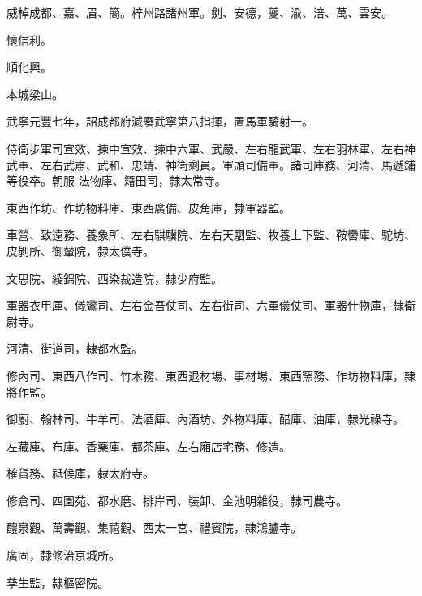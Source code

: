 \begin{pinyinscope}
 威棹成都、嘉、眉、簡。梓州路諸州軍。劍、安德，夔、渝、涪、萬、雲安。



 懷信利。



 順化興。



 本城梁山。



 武寧元豐七年，詔成都府減廢武寧第八指揮，置馬軍騎射一。



 侍衛步軍司宣效、揀中宣效、揀中六軍、武嚴、左右龍武軍、左右羽林軍、左右神武軍、左右武肅、武和、忠靖、神衛剩員。軍頭司備軍。諸司庫務、河清、馬遞鋪等役卒。朝服
 法物庫、籍田司，隸太常寺。



 東西作坊、作坊物料庫、東西廣備、皮角庫，隸軍器監。



 車營、致遠務、養象所、左右騏驥院、左右天駟監、牧養上下監、鞍轡庫、駝坊、皮剝所、御輦院，隸太僕寺。



 文思院、綾錦院、西染裁造院，隸少府監。



 軍器衣甲庫、儀鸞司、左右金吾仗司、左右街司、六軍儀仗司、軍器什物庫，隸衛尉寺。



 河清、街道司，隸都水監。



 修內司、東西八作司、竹木務、東西退材場、事材場、東西窯務、作坊物料庫，隸將作監。



 御廚、翰林司、牛羊司、法酒庫、內酒坊、外物料庫、醋庫、油庫，隸光祿寺。



 左藏庫、布庫、香藥庫、都茶庫、左右廂店宅務、修造。



 榷貨務、祗候庫，隸太府寺。



 修倉司、四園苑、都水磨、排岸司、裝卸、金池明雜役，隸司農寺。



 醴泉觀、萬壽觀、集禧觀、西太一宮、禮賓院，隸鴻臚寺。



 廣固，隸修治京城所。



 孳生監，隸樞密院。




\end{pinyinscope}
